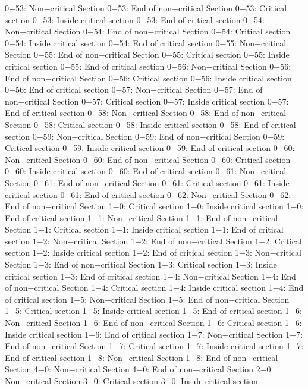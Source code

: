 0−53: Non−critical Section
0−53: End of non−critical Section
0−53: Critical section
0−53: Inside critical section
0−53: End of critical section
0−54: Non−critical Section
0−54: End of non−critical Section
0−54: Critical section
0−54: Inside critical section
0−54: End of critical section
0−55: Non−critical Section
0−55: End of non−critical Section
0−55: Critical section
0−55: Inside critical section
0−55: End of critical section
0−56: Non−critical Section
0−56: End of non−critical Section
0−56: Critical section
0−56: Inside critical section
0−56: End of critical section
0−57: Non−critical Section
0−57: End of non−critical Section
0−57: Critical section
0−57: Inside critical section
0−57: End of critical section
0−58: Non−critical Section
0−58: End of non−critical Section
0−58: Critical section
0−58: Inside critical section
0−58: End of critical section
0−59: Non−critical Section
0−59: End of non−critical Section
0−59: Critical section
0−59: Inside critical section
0−59: End of critical section
0−60: Non−critical Section
0−60: End of non−critical Section
0−60: Critical section
0−60: Inside critical section
0−60: End of critical section
0−61: Non−critical Section
0−61: End of non−critical Section
0−61: Critical section
0−61: Inside critical section
0−61: End of critical section
0−62: Non−critical Section
0−62: End of non−critical Section
1−0: Critical section
1−0: Inside critical section
1−0: End of critical section
1−1: Non−critical Section
1−1: End of non−critical Section
1−1: Critical section
1−1: Inside critical section
1−1: End of critical section
1−2: Non−critical Section
1−2: End of non−critical Section
1−2: Critical section
1−2: Inside critical section
1−2: End of critical section
1−3: Non−critical Section
1−3: End of non−critical Section
1−3: Critical section
1−3: Inside critical section
1−3: End of critical section
1−4: Non−critical Section
1−4: End of non−critical Section
1−4: Critical section
1−4: Inside critical section
1−4: End of critical section
1−5: Non−critical Section
1−5: End of non−critical Section
1−5: Critical section
1−5: Inside critical section
1−5: End of critical section
1−6: Non−critical Section
1−6: End of non−critical Section
1−6: Critical section
1−6: Inside critical section
1−6: End of critical section
1−7: Non−critical Section
1−7: End of non−critical Section
1−7: Critical section
1−7: Inside critical section
1−7: End of critical section
1−8: Non−critical Section
1−8: End of non−critical Section
4−0: Non−critical Section
4−0: End of non−critical Section
2−0: Non−critical Section
3−0: Critical section
3−0: Inside critical section
